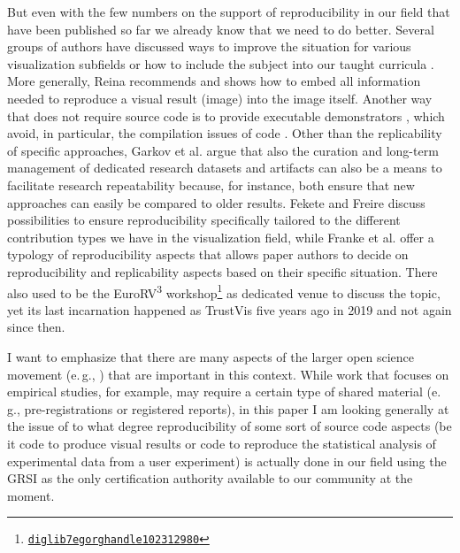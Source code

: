\documentclass[conference,svgnames]{vgtc}                     %
\newcommand{\eg}{e.\,g.}
\begin{document}
But even with the few numbers on the support of reproducibility in our field that have been published so far we already know that we need to do better. Several groups of authors have discussed ways to improve the situation for various visualization subfields \cite{Chopra:2023:PGG,Cushing:2018:SVR,Sukumar:2018:TDU,Valdez:2018:RRR} or how to include the subject into our taught curricula \cite{Syeda:2024:VRT}. More generally, Reina \cite{Reina:2023:CID} recommends and shows how to embed all information needed to reproduce a visual result (image) into the image itself. Another way that does not require source code is to provide executable demonstrators \cite{Bonneel:2020:CRC,Isenberg:2022:PEP}, which avoid, in particular, the compilation issues of code \cite{Bonneel:2020:CRC}. Other than the replicability of specific approaches, Garkov et al. \cite{Garkov:2022:RDC} argue that also the curation and long-term management of dedicated research datasets and artifacts can also be a means to facilitate research repeatability because, for instance, both ensure that new approaches can easily be compared to older results. Fekete and Freire \cite{Fekete:2020:ERV} discuss possibilities to ensure reproducibility specifically tailored to the different contribution types we have in the visualization field, while Franke et al. \cite{Franke:2023:TRV} offer a typology of reproducibility aspects that allows paper authors to decide on reproducibility and replicability aspects based on their specific situation. There also used to be the EuroRV\textsuperscript{3} workshop\footnote{\href{https://diglib7.eg.org/handle/10.2312/980}{\texttt{diglib7egorg\discretionary{/}{}{/}handle\discretionary{/}{}{/}102312\discretionary{/}{}{/}980}}} as dedicated venue to discuss the topic, yet its last incarnation happened as TrustVis five years ago in 2019 and not again since then.

I want to emphasize that there are many aspects of the larger open science movement (\eg, \cite{Jansen:2024:MWB}) that are important in this context. While work that focuses on empirical studies, for example, may require a certain type of shared material \cite{Kosara:2018:SRC} (\eg, pre-registrations or registered reports), in this paper I am looking generally at the issue of to what degree reproducibility of some sort of source code aspects (be it code to produce visual results or code to reproduce the statistical analysis of experimental data from a user experiment) is actually done in our field using the GRSI as the only certification authority available to our community at the moment.
\end{document}

